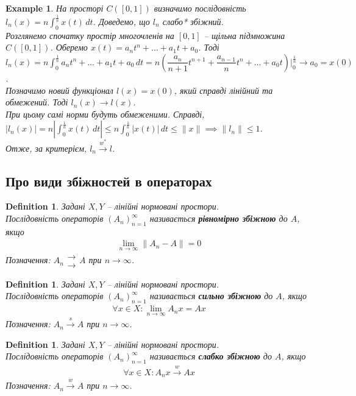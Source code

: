 \documentclass[a4paper, 10pt]{article}
\theoremstyle{theoremdd}
\theoremstyle{theoremdd}
\newtheorem{definition}[theorem]{Definition}
\theoremstyle{theoremdd}
\theoremstyle{theoremdd}
\newtheorem{example}[theorem]{Example}
\theoremstyle{theoremdd}
\theoremstyle{theoremdd}
\theoremstyle{theoremdd}
\theoremstyle{theoremdd}
\newcommand{\toweak}{\overset{w}{\to}}
\newcommand{\tostrong}{\overset{s}{\to}}
\newcommand{\toweakstar}{\overset{w^*}{\to}}
\begin{document}
\begin{example}
На просторі $C([0,1])$ визначимо послідовність $l_n(x) = n \displaystyle\int_0^{\frac{1}{n}} x(t)\,dt$. Доведемо, що $l_n$ слабо* збіжний.\\
Розглянемо спочатку простір многочленів на $[0,1]$ -- щільна підмножина $C([0,1])$. Оберемо $x(t) = a_n t^n + \dots + a_1 t + a_0$. Тоді\\
$l_n(x) = n\displaystyle\int_0^{\frac{1}{n}} a_n t^n + \dots + a_1 t + a_0\,dt = n \left( \dfrac{a_n}{n+1}t^{n+1} + \dfrac{a_{n-1}}{n}t^n + \dots + a_0 t \right)\Big|_{0}^{\frac{1}{n}} \to a_0 = x(0)$.\\
Позначимо новий функціонал $l(x) = x(0)$, який справді лінійний та обмежений. Тоді $l_n(x) \to l(x)$.\\
При цьому самі норми будуть обмеженими. Справді,\\
$|l_n(x)| = n \displaystyle\left|\int_0^{\frac{1}{n}} x(t)\,dt\right| \leq n \int_0^{\frac{1}{n}} |x(t)|\,dt \leq \|x\| \implies \|l_n\| \leq 1$.\\
Отже, за критерієм, $l_n \toweakstar l$.
\end{example}

\subsection{Про види збіжностей в операторах}
\begin{definition}
Задані $X,Y$ -- лінійні нормовані простори.\\
Послідовність операторів $(A_n)_{n=1}^\infty$ називається \textbf{рівномірно збіжною} до $A$, якщо
\begin{align*}
\lim_{n \to \infty}\|A_n - A\| = 0
\end{align*}
Позначення: $A_n \substack{\to \\ \to} A$ при $n \to \infty$.
\end{definition}

\begin{definition}
Задані $X,Y$ -- лінійні нормовані простори.\\
Послідовність операторів $(A_n)_{n=1}^\infty$ називається \textbf{сильно збіжною} до $A$, якщо
\begin{align*}
\forall x \in X: \lim_{n \to \infty} A_n x = A x
\end{align*}
Позначення: $A_n \tostrong A$ при $n \to \infty$.
\end{definition}

\begin{definition}
Задані $X,Y$ -- лінійні нормовані простори.\\
Послідовність операторів $(A_n)_{n=1}^\infty$ називається \textbf{слабко збіжною} до $A$, якщо
\begin{align*}
\forall x \in X: A_n x \toweak A x
\end{align*}
Позначення: $A_n \toweak A$ при $n \to \infty$.
\end{definition}
\end{document}
